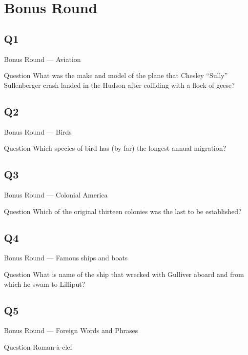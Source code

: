 \documentclass[11pt]{beamer}
\begin{document}
\section{Bonus Round}
\subsection*{Q1}
\begin{frame}[t]{Bonus Round --- Aviation}
    \vspace{-0.5em}
    \begin{block}{Question}
        What was the make and model of the plane that Chesley ``Sully'' Sullenberger crash landed in the Hudson after colliding with a flock of geese?
    \end{block}
\end{frame}
\subsection*{Q2}
\begin{frame}[t]{Bonus Round --- Birds}
    \vspace{-0.5em}
    \begin{block}{Question}
        Which species of bird has (by far) the longest annual migration?
    \end{block}
\end{frame}
\subsection*{Q3}
\begin{frame}[t]{Bonus Round --- Colonial America}
    \vspace{-0.5em}
    \begin{block}{Question}
        Which of the original thirteen colonies was the last to be established?
    \end{block}
\end{frame}
\subsection*{Q4}
\begin{frame}[t]{Bonus Round --- Famous ships and boats}
    \vspace{-0.5em}
    \begin{block}{Question}
        What is name of the ship that wrecked with Gulliver aboard and from which he swam to Lilliput?
    \end{block}
\end{frame}
\subsection*{Q5}
\begin{frame}[t]{Bonus Round --- Foreign Words and Phrases}
    \vspace{-0.5em}
    \begin{block}{Question}
        Roman-à-clef
    \end{block}
\end{frame}
\end{document}
